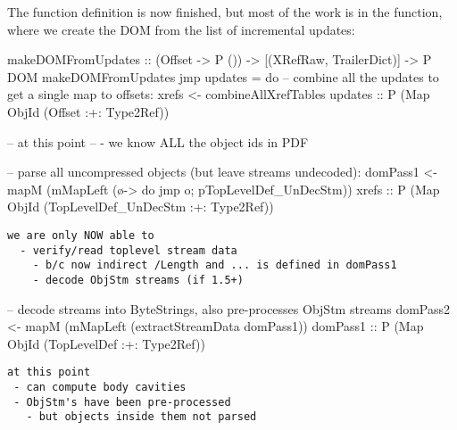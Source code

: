 
The  function definition is now finished, but most of
the work is in the  function,
where we create the DOM from the list of incremental updates:

\begin{code}
makeDOMFromUpdates :: (Offset -> P ()) -> [(XRefRaw, TrailerDict)] -> P DOM
makeDOMFromUpdates jmp updates =
    do
    -- combine all the updates to get a single map to offsets:
    xrefs <- combineAllXrefTables updates
             :: P (Map ObjId (Offset :+: Type2Ref))

    -- at this point
    --  - we know ALL the object ids in PDF

    -- parse all uncompressed objects (but leave streams undecoded):
    domPass1 <- mapM
                  (mMapLeft (\o-> do {jmp o; pTopLevelDef_UnDecStm}))
                  xrefs
                :: P (Map ObjId (TopLevelDef_UnDecStm :+: Type2Ref))
\end{code}



\begin{lstlisting}[style=meta]
we are only NOW able to
  - verify/read toplevel stream data
    - b/c now indirect /Length and ... is defined in domPass1
    - decode ObjStm streams (if 1.5+)
\end{lstlisting}

\begin{code}
    -- decode streams into ByteStrings, also pre-processes ObjStm streams
    domPass2 <- mapM
                  (mMapLeft (extractStreamData domPass1))
                  domPass1
                :: P (Map ObjId (TopLevelDef :+: Type2Ref))
\end{code}

\begin{lstlisting}[style=meta]
at this point
 - can compute body cavities
 - ObjStm's have been pre-processed
   - but objects inside them not parsed
\end{lstlisting}

